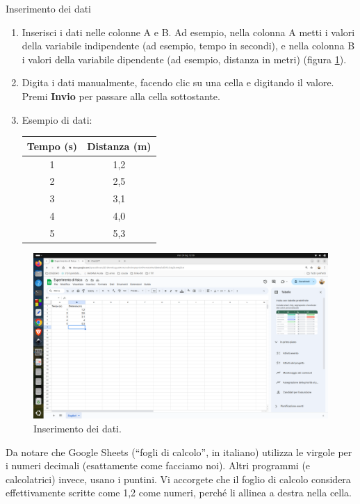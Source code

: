 \documentclass[12pt,a4paper,oneside]{book}
\makeatletter
\renewcommand{\subsection}{\@startsection {subsection}{2}{\z@}
{-3ex \@plus -0.1ex \@minus -.4ex}
{0.5ex \@plus.2ex }
{\color[rgb]{0.141,0.596,0.749}\normalfont\sffamily\bfseries}}
\theoremstyle{esercizio}
\makeatother
\begin{document}
\subsection{Inserimento dei dati}
\begin{enumerate}
    \item Inserisci i dati nelle colonne A e B. Ad esempio, nella colonna A metti i valori della variabile indipendente (ad esempio, tempo in secondi), e nella colonna B i valori della variabile dipendente (ad esempio, distanza in metri) (figura \ref{fig:dati}).
    \item Digita i dati manualmente, facendo clic su una cella e digitando il valore. Premi \textbf{Invio} per passare alla cella sottostante.
    \item Esempio di dati:
    \begin{center}
    \begin{tabular}{|c|c|}
    \hline
    Tempo (s) & Distanza (m) \\
    \hline
    1 & 1,2 \\
    2 & 2,5 \\
    3 & 3,1 \\
    4 & 4,0 \\
    5 & 5,3 \\
    \hline
    \end{tabular}
    \end{center}
\end{enumerate}
    \begin{figure}[h!]
    \centering
    \includegraphics[width=\linewidth]{img/dati.png} 
    \caption{Inserimento dei dati.}
    \label{fig:dati}
\end{figure} 

Da notare che Google Sheets (``fogli di calcolo'', in italiano) utilizza le virgole per i numeri decimali (esattamente come facciamo noi). Altri programmi (e calcolatrici) invece, usano i puntini. Vi accorgete che il foglio di calcolo considera effettivamente scritte come 1,2 come numeri, perché li allinea a destra nella cella.
\end{document}
